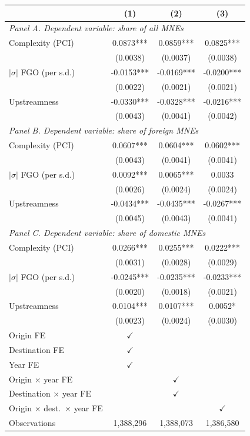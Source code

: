 \begin{tabular}{lccc} \hline
 & (1) & (2) & (3) \\ \hline
\multicolumn{4}{l}{\textit{Panel A. Dependent variable: share of all MNEs}} \\
Complexity (PCI) & 0.0873*** & 0.0859*** & 0.0825*** \\
 & (0.0038) & (0.0037) & (0.0038) \\
$|\sigma|$ FGO (per s.d.) & -0.0153*** & -0.0169*** & -0.0200*** \\
 & (0.0022) & (0.0021) & (0.0021) \\
Upstreamness & -0.0330*** & -0.0328*** & -0.0216*** \\
 & (0.0043) & (0.0041) & (0.0042) \\
\midrule
\multicolumn{4}{l}{\textit{Panel B. Dependent variable: share of foreign MNEs}} \\
Complexity (PCI) & 0.0607*** & 0.0604*** & 0.0602*** \\
 & (0.0043) & (0.0041) & (0.0041) \\
$|\sigma|$ FGO (per s.d.) & 0.0092*** & 0.0065*** & 0.0033 \\
 & (0.0026) & (0.0024) & (0.0024) \\
Upstreamness & -0.0434*** & -0.0435*** & -0.0267*** \\
 & (0.0045) & (0.0043) & (0.0041) \\
\midrule
\multicolumn{4}{l}{\textit{Panel C. Dependent variable: share of domestic MNEs}} \\
Complexity (PCI) & 0.0266*** & 0.0255*** & 0.0222*** \\
 & (0.0031) & (0.0028) & (0.0029) \\
$|\sigma|$ FGO (per s.d.) & -0.0245*** & -0.0235*** & -0.0233*** \\
 & (0.0020) & (0.0018) & (0.0021) \\
Upstreamness & 0.0104*** & 0.0107*** & 0.0052* \\
 & (0.0023) & (0.0024) & (0.0030) \\
\hline
Origin FE & $\checkmark$ &  &  \\
Destination FE & $\checkmark$ &  &  \\
Year FE & $\checkmark$ &  &  \\
Origin $\times$ year FE &  & $\checkmark$ &  \\
Destination $\times$ year FE &  & $\checkmark$ &  \\
Origin $\times$ dest.\ $\times$ year FE &  &  & $\checkmark$ \\
Observations & 1,388,296 & 1,388,073 & 1,386,580 \\
\hline
\end{tabular}
